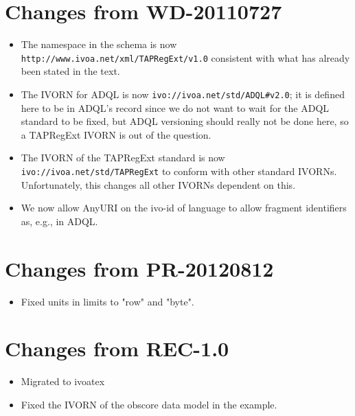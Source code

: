\documentclass{ivoa}
\begin{document}
\section{Changes from WD-20110727}

\label{changes-20110727}

\begin{itemize}

\item The namespace in the schema is now \nolinkurl{http://www.ivoa.net/xml/TAPRegExt/v1.0} consistent with what has already been stated in the text.{}

\item The IVORN for ADQL is now \nolinkurl{ivo://ivoa.net/std/ADQL\#v2.0}; it is defined here to be in ADQL's record since we do not want to wait for the ADQL standard to be fixed, but ADQL versioning should really not be done here, so a TAPRegExt IVORN is out of the question.{}

\item The IVORN of the TAPRegExt standard is now \texttt{ivo://ivoa.net/std/TAPRegExt} to conform with other standard IVORNs.  Unfortunately, this changes
all other IVORNs dependent on this.{}

\item We now allow AnyURI on the ivo-id of language to allow fragment identifiers as, e.g., in ADQL.{}

\end{itemize}


\section{Changes from PR-20120812}

\label{changes-20120208}

\begin{itemize}

\item Fixed units in limits to "row" and "byte".{}

\end{itemize}

\section{Changes from REC-1.0}

\label{changes-v1.0}

\begin{itemize}

\item Migrated to ivoatex
\item Fixed the IVORN of the obscore data model in the example.{}

\end{itemize}


\end{document}
